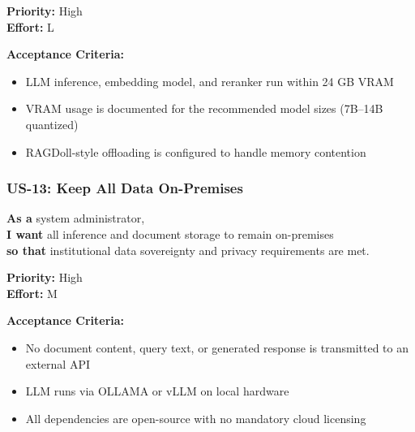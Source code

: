 \documentclass[
  11pt,
]{article}
\providecommand{\tightlist}{%
  \setlength{\itemsep}{0pt}\setlength{\parskip}{0pt}}
\begin{document}
\textbf{Priority:} High\\
\textbf{Effort:} L

\textbf{Acceptance Criteria:}

\begin{itemize}
\tightlist
\item
  LLM inference, embedding model, and reranker run within 24 GB VRAM
\item
  VRAM usage is documented for the recommended model sizes (7B--14B
  quantized)
\item
  RAGDoll-style offloading is configured to handle memory contention
\end{itemize}

\subsubsection{US-13: Keep All Data
On-Premises}\label{us-13-keep-all-data-on-premises}

\textbf{As a} system administrator,\\
\textbf{I want} all inference and document storage to remain
on-premises\\
\textbf{so that} institutional data sovereignty and privacy requirements
are met.

\textbf{Priority:} High\\
\textbf{Effort:} M

\textbf{Acceptance Criteria:}

\begin{itemize}
\tightlist
\item
  No document content, query text, or generated response is transmitted
  to an external API
\item
  LLM runs via OLLAMA or vLLM on local hardware
\item
  All dependencies are open-source with no mandatory cloud licensing
\end{itemize}
\end{document}
